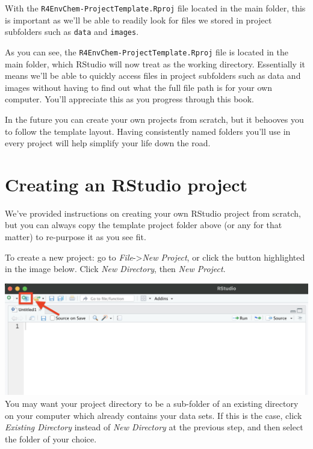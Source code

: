 \documentclass[
]{book}
\begin{document}
With the \texttt{R4EnvChem-ProjectTemplate.Rproj} file located in the main folder, this is important as we'll be able to readily look for files we stored in project subfolders such as \texttt{data} and \texttt{images}.

As you can see, the \texttt{R4EnvChem-ProjectTemplate.Rproj} file is located in the main folder, which RStudio will now treat as the working directory. Essentially it means we'll be able to quickly access files in project subfolders such as data and images without having to find out what the full file path is for your own computer. You'll appreciate this as you progress through this book.

In the future you can create your own projects from scratch, but it behooves you to follow the template layout. Having consistently named folders you'll use in every project will help simplify your life down the road.

\hypertarget{creating-an-rstudio-project}{%
\section{Creating an RStudio project}\label{creating-an-rstudio-project}}

We've provided instructions on creating your own RStudio project from scratch, but you can always copy the template project folder above (or any for that matter) to re-purpose it as you see fit.

To create a new project: go to \emph{File}-\textgreater{}\emph{New Project}, or click the button highlighted in the image below. Click \emph{New Directory}, then \emph{New Project}.

\includegraphics{images/Rstudio_newproject.png} You may want your project directory to be a sub-folder of an existing directory on your computer which already contains your data sets. If this is the case, click \emph{Existing Directory} instead of \emph{New Directory} at the previous step, and then select the folder of your choice.
\end{document}
